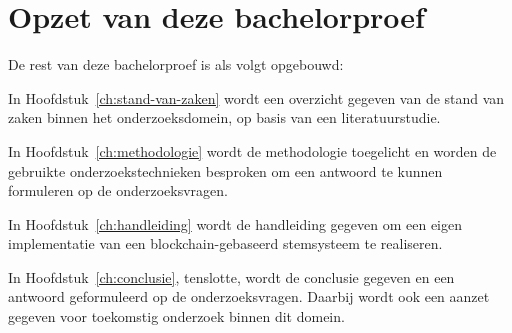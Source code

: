 \section{Opzet van deze bachelorproef}
\label{sec:opzet-bachelorproef}
De rest van deze bachelorproef is als volgt opgebouwd:

In Hoofdstuk~\ref{ch:stand-van-zaken} wordt een overzicht gegeven van de stand van zaken binnen het onderzoeksdomein, op basis van een literatuurstudie.

In Hoofdstuk~\ref{ch:methodologie} wordt de methodologie toegelicht en worden de gebruikte onderzoekstechnieken besproken om een antwoord te kunnen formuleren op de onderzoeksvragen.

In Hoofdstuk~\ref{ch:handleiding} wordt de handleiding gegeven om een eigen implementatie van een blockchain-gebaseerd stemsysteem te realiseren.

In Hoofdstuk~\ref{ch:conclusie}, tenslotte, wordt de conclusie gegeven en een antwoord geformuleerd op de onderzoeksvragen. Daarbij wordt ook een aanzet gegeven voor toekomstig onderzoek binnen dit domein.